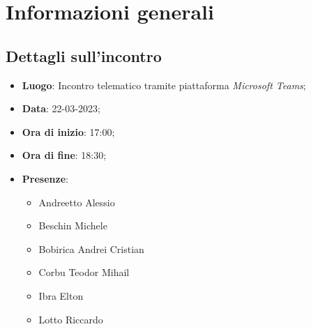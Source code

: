 \section{Informazioni generali}

\subsection{Dettagli sull'incontro}
\begin{itemize}
\item \textbf{Luogo}: Incontro telematico tramite piattaforma \textit{Microsoft Teams\glo};
\item \textbf{Data}: 22-03-2023;
\item \textbf{Ora di inizio}: 17:00;
\item \textbf{Ora di fine}: 18:30;
\item \textbf{Presenze}: 
\begin{itemize}
	\item Andreetto Alessio
    \item Beschin Michele
    \item Bobirica Andrei Cristian
    \item Corbu Teodor Mihail
    \item Ibra Elton
    \item Lotto Riccardo
\end{itemize}
\end{itemize}



